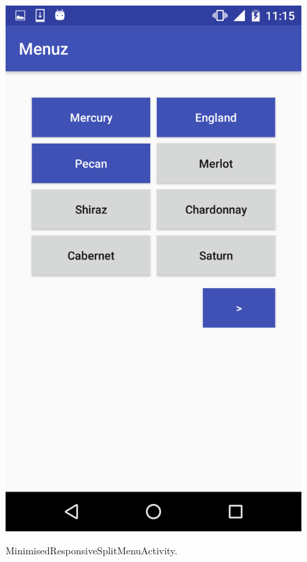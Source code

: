 \begin{figure}[!ht]
  \begin{center}
    \includegraphics[scale=0.22]{img/minirespsplit_menu.png}
    \label{fig:minirespsplit_menu}
    \caption{MinimisedResponsiveSplitMenuActivity.}
  \end{center}
\end{figure}

\newpage

